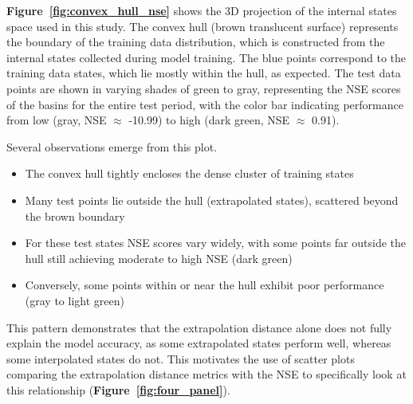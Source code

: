 \documentclass{article}
\begin{document}
\textbf{Figure~\ref{fig:convex_hull_nse}} shows the 3D projection of the internal states space used in this study. The convex hull (brown translucent surface) represents the boundary of the training data distribution, which is constructed from the internal states collected during model training. The blue points correspond to the training data states, which lie mostly within the hull, as expected. The test data points are shown in varying shades of green to gray, representing the NSE scores of the basins for the entire test period, with the color bar indicating performance from low (gray, NSE $\approx$ -10.99) to high (dark green, NSE $\approx$ 0.91).

Several observations emerge from this plot.
\begin{itemize}
    \item The convex hull tightly encloses the dense cluster of training states
    \item Many test points lie outside the hull (extrapolated states), scattered beyond the brown boundary
    \item For these test states NSE scores vary widely, with some points far outside the hull still achieving moderate to high NSE (dark green)
    \item Conversely, some points within or near the hull exhibit poor performance (gray to light green)
\end{itemize}

This pattern demonstrates that the extrapolation distance alone does not fully explain the model accuracy, as some extrapolated states perform well, whereas some interpolated states do not. This motivates the use of scatter plots comparing the extrapolation distance metrics with the NSE to specifically look at this relationship (\textbf{Figure~\ref{fig:four_panel}}).
\end{document}
